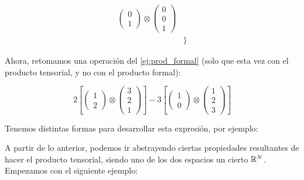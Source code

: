 \begin{ejemplo}
\begin{equation}
\begin{split}
        \begin{pmatrix}0 \\ 1 \end{pmatrix} \otimes \begin{pmatrix} 0 \\ 0 \\ 1 \end{pmatrix} \\
    & \}
    \end{split}
    \end{equation}

    Ahora, retomamos una operación del \ref{ej:prod_formal} (solo que esta vez con el producto tensorial, y no con el producto formal):

    $$
    2 \left[ \begin{pmatrix}1 \\ 2\end{pmatrix} \otimes \begin{pmatrix}3 \\ 2 \\ 1 \end{pmatrix} \right]
    - 3 \left[ \begin{pmatrix}1 \\ 0\end{pmatrix} \otimes \begin{pmatrix}1 \\ 2 \\ 3 \end{pmatrix} \right]
    $$

    Tenemos distintas formas para desarrollar esta expresión, por ejemplo:


\end{ejemplo}

A partir de lo anterior, podemos ir abstrayendo ciertas propiedades resultantes de hacer el producto tensorial, siendo uno de los dos espacios un cierto $\mathbb{R}^N$. Empezamos con el siguiente ejemplo:

